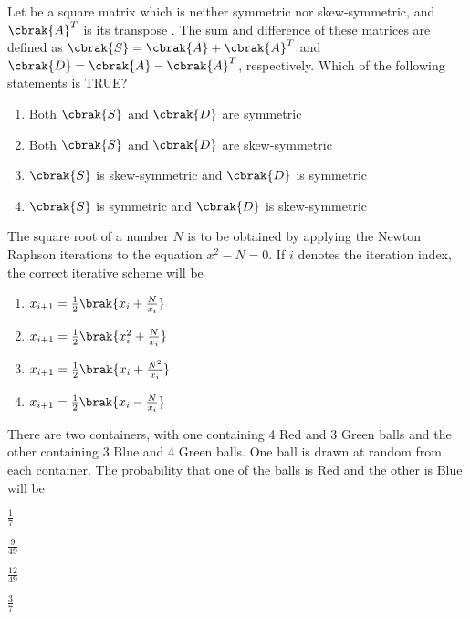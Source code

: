 \iffalse
\title{CE-2011-1-13}
\author{EE24BTECH11036 - Krishna Patil}
\section{ce}
\chapter{2011}
\fi
\item Let   be a square matrix which is neither symmetric nor skew-symmetric, and  ${\cbrak{A}}^{T}$ is its transpose . The sum and difference of these matrices are defined as $\cbrak{S} = \cbrak{A} + {\cbrak{A}}^{T}$  and  $\cbrak{D} = \cbrak{A} - {\cbrak{A}}^{T}$, respectively. Which of the following statements is TRUE?
\begin{enumerate}
\item Both $\cbrak{S}$ and $\cbrak{D}$ are symmetric 
\item Both $\cbrak{S}$ and $\cbrak{D}$ are skew-symmetric
\item $\cbrak{S}$ is skew-symmetric and $\cbrak{D}$ is symmetric
\item $\cbrak{S}$ is symmetric and $\cbrak{D}$ is skew-symmetric
\end{enumerate}
\item The square root of a number $N$ is to be obtained by applying the Newton Raphson iterations to the equation $x^2 - N = 0$. If $i$ denotes the iteration index, the correct iterative scheme will be
\begin{enumerate}
    \item $x_{i+1} = \frac{1}{2} \brak{x_i + \frac{N}{x_i}}$
\item $x_{i+1} = \frac{1}{2} \brak{x_i^2 + \frac{N}{x_i}}$
\item $x_{i+1} = \frac{1}{2} \brak{x_i + \frac{N^2}{x_i}}$
\item $x_{i+1} = \frac{1}{2} \brak{x_i - \frac{N}{x_i}}$
\end{enumerate}
\item There are two containers, with one containing 4 Red and 3 Green balls and the other containing 3 Blue and 4 Green balls. One ball is drawn at random from each container. The probability that one of the balls is Red and the other is Blue will be
\begin{enumerate}
\begin{multicols}{2}
\item $\frac{1}{7}$
\item $\frac{9}{49}$
\item $\frac{12}{49}$
\item $\frac{3}{7}$
\end{multicols}
\end{enumerate}

